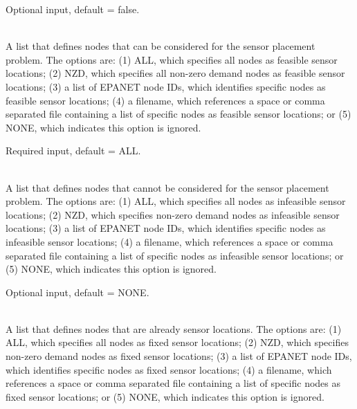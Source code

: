 \begin{description}[topsep=0pt,parsep=0.5em,itemsep=-0.4em]
\begin{description}[topsep=0pt,parsep=0.5em,itemsep=-0.4em]
                Optional input, default = false.
    \item[{location}]\hfill
    \begin{description}[topsep=0pt,parsep=0.5em,itemsep=-0.4em]
      \item[{feasible nodes}]\hfill
\\A list that defines nodes that can be considered for the sensor placement problem.
                The options are:
                (1) ALL, which specifies all nodes as feasible sensor locations;
                (2) NZD, which specifies all non-zero demand nodes as feasible sensor locations;
                (3) a list of EPANET node IDs, which identifies specific nodes as feasible sensor locations; 
                (4) a filename, which references a space or comma separated file containing a list of 
                specific nodes as feasible sensor locations; or
                (5) NONE, which indicates this option is ignored.
                
                Required input, default = ALL.
      \item[{infeasible nodes}]\hfill
\\A list that defines nodes that cannot be considered for the sensor placement problem.
                The options are:
                (1) ALL, which specifies all nodes as infeasible sensor locations;
                (2) NZD, which specifies non-zero demand nodes as infeasible sensor locations;
                (3) a list of EPANET node IDs, which identifies specific nodes as infeasible sensor locations;
                (4) a filename, which references a space or comma separated file containing a list of 
                specific nodes as infeasible sensor locations; or
                (5) NONE, which indicates this option is ignored.
                
                Optional input, default = NONE.
      \item[{fixed nodes}]\hfill
\\A list that defines nodes that are already sensor locations.
                The options are:
                (1) ALL, which specifies all nodes as fixed sensor locations;
                (2) NZD, which specifies non-zero demand nodes as fixed sensor locations;
                (3) a list of EPANET node IDs, which identifies specific nodes as fixed sensor locations; 
                (4) a filename, which references a space or comma separated file containing a list of 
                specific nodes as fixed sensor locations; or
                (5) NONE, which indicates this option is ignored.
                

\end{description}
\end{description}
\end{description}
